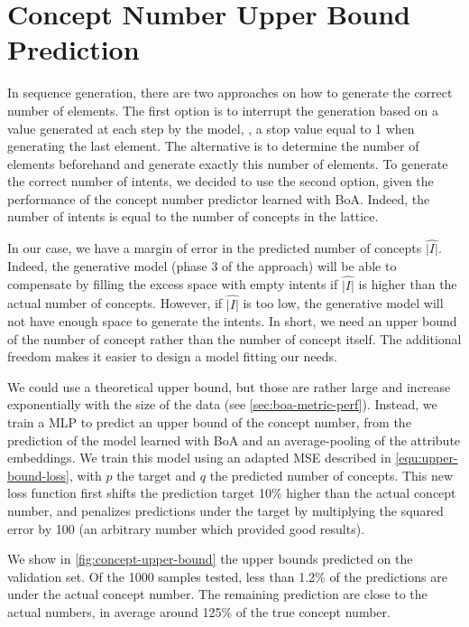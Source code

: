 \section{Concept Number Upper Bound Prediction}\label{sec:upper-bound}
In sequence generation, there are two approaches on how to generate the correct number of elements.
The first option is to interrupt the generation based on a value generated at each step by the model, \eg, a stop value equal to 1 when generating the last element.
The alternative is to determine the number of elements beforehand and generate exactly this number of elements.
To generate the correct number of intents, we decided to use the second option, given the performance of the concept number predictor learned with BoA. Indeed, the number of intents is equal to the number of concepts in the lattice.

In our case, we have a margin of error in the predicted number of concepts $\hat{|I|}$.
Indeed, the generative model (phase 3 of the approach) will be able to compensate by filling the excess space with empty intents if $\hat{|I|}$ is higher than the actual number of concepts.
However, if $\hat{|I|}$ is too low, the generative model will not have enough space to generate the intents.
In short, we need an upper bound of the number of concept rather than the number of concept itself.
The additional freedom makes it easier to design a model fitting our needs.

We could use a theoretical upper bound, but those are rather large and increase exponentially with the size of the data (see \cref{sec:boa-metric-perf}).
Instead, we train a MLP to predict an upper bound of the concept number, from the prediction of the model learned with BoA and an average-pooling of the attribute embeddings. We train this model using an adapted MSE described in \cref{equ:upper-bound-loss}, with $p$ the target and $q$ the predicted number of concepts.
This new loss function first shifts the prediction target 10\% higher than the actual concept number, and penalizes predictions under the target by multiplying the squared error by 100 (an arbitrary number which provided good results).

We show in \cref{fig:concept-upper-bound} the upper bounds predicted on the validation set.
Of the 1000 samples tested, less than 1.2\% of the predictions are under the actual concept number.
The remaining prediction are close to the actual numbers, in average around 125\% of the true concept number.

